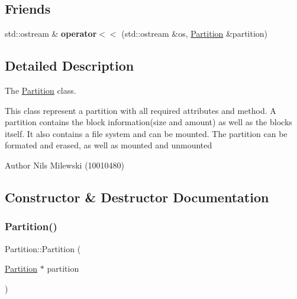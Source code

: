 \subsection*{Friends}
\begin{DoxyCompactItemize}
\item 
\mbox{\label{classcore_1_1logic_1_1_partition_a9182c56fedac445f5d17d76f2efc9896}} 
std\+::ostream \& {\bfseries operator$<$$<$} (std\+::ostream \&os, \mbox{\hyperlink{classcore_1_1logic_1_1_partition}{Partition}} \&partition)
\end{DoxyCompactItemize}


\subsection{Detailed Description}
The \mbox{\hyperlink{classcore_1_1logic_1_1_partition}{Partition}} class. 

This class represent a partition with all required attributes and method. A partition contains the block information(size and amount) as well as the blocks itself. It also contains a file system and can be mounted. The partition can be formated and erased, as well as mounted and unmounted \begin{DoxyAuthor}{Author}
Nils Milewski (10010480) 
\end{DoxyAuthor}


\subsection{Constructor \& Destructor Documentation}
\mbox{\label{classcore_1_1logic_1_1_partition_acb291b3b0ccf48005e141be32fdd7efd}} 
\subsubsection{\texorpdfstring{Partition()}{Partition()}\hspace{0.1cm}{\footnotesize\ttfamily [1/3]}}
{\footnotesize\ttfamily Partition\+::\+Partition (\begin{DoxyParamCaption}\item[{\mbox{\hyperlink{classcore_1_1logic_1_1_partition}{Partition}} $\ast$}]{partition }\end{DoxyParamCaption})\hspace{0.3cm}{\ttfamily [private]}}



